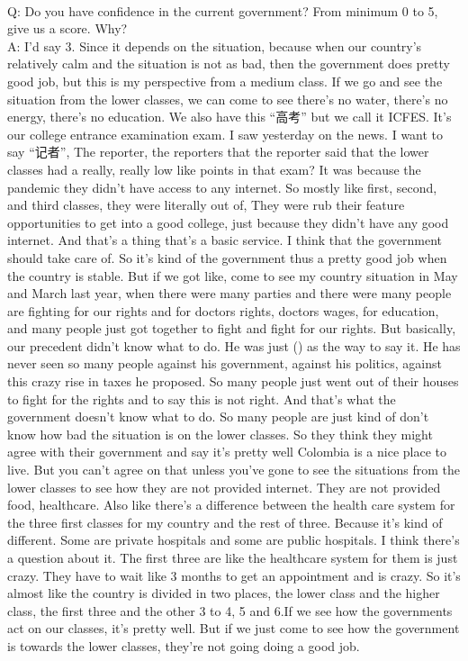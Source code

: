 \documentclass{phyasgn}\usepackage{nag}
\begin{document}
\\
Q: Do you have confidence in the current government? From minimum 0 to 5, give us a score. Why?\\
A: I'd say 3. Since it depends on the situation, because when our country's relatively calm and the situation is not as bad, then the government does pretty good job, but this is my perspective from a medium class. If we go and see the situation from the lower classes, we can come to see there's no water, there's no energy, there's no education. We also have this “高考” but we call it ICFES. It's our college entrance examination exam.
I saw yesterday on the news. I want to say “记者”, The reporter, the reporters that the reporter said that the lower classes had a really, really low like points in that exam? It was because the pandemic they didn't have access to any internet. So mostly like first, second, and third classes, they were literally out of, They were rub their feature opportunities to get into a good college, just because they didn't have any good internet. And that's a thing that's a basic service. I think that the government should take care of. So it's kind of the government thus a pretty good job when the country is stable. But if we got like, come to see my country situation in May and March last year, when there were many parties and there were many people are fighting for our rights and for doctors rights, doctors wages, for education, and many people just got together to fight and fight for our rights. But basically, our precedent didn't know what to do. He was just () as the way to say it. He has never seen so many people against his government, against his politics, against this crazy rise in taxes he proposed. So many people just went out of their houses to fight for the rights and to say this is not right. And that's what the government doesn't know what to do. So many people are just kind of don't know how bad the situation is on the lower classes. So they think they might agree with their government and say it's pretty well Colombia is a nice place to live. But you can't agree on that unless you've gone to see the situations from the lower classes to see how they are not provided internet. They are not provided food, healthcare. Also like there's a difference between the health care system for the three first classes for my country and the rest of three. Because it's kind of different. Some are private hospitals and some are public hospitals. I think there's a question about it. The first three are like the healthcare system for them is just crazy. They have to wait like 3 months to get an appointment and is crazy. So it's almost like the country is divided in two places, the lower class and the higher class, the first three and the other 3 to 4, 5 and 6.If we see how the governments act on our classes, it's pretty well. But if we just come to see how the government is towards the lower classes, they're not going doing a good job.\\
\end{document}
